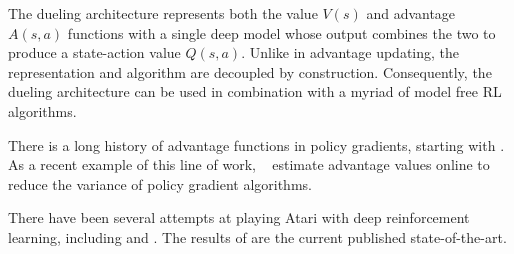 The dueling architecture represents both the value $V(s)$ and advantage $A(s,a)$ functions with a single deep model whose output combines the two to produce a state-action value $Q(s,a)$. Unlike in advantage updating, the representation and algorithm are decoupled by construction. Consequently, the dueling architecture can be used in combination with a myriad of model free RL algorithms. 




There is a long history of advantage functions in policy gradients, starting with \cite{Sutton:2000}.
As a recent example of this line of work, ~\citet{schulman2015advantage} estimate advantage values online to reduce the variance of policy gradient algorithms. 


There have been several attempts at playing Atari with deep reinforcement learning, including \citet{Mnih:2015,Guo:2014,Stadie:2015,Nair:2015,vanHasselt:2015,Bellemare2015Persistent} and \citet{Schaul:2015}. The results of \citet{Schaul:2015} are the current published state-of-the-art.






